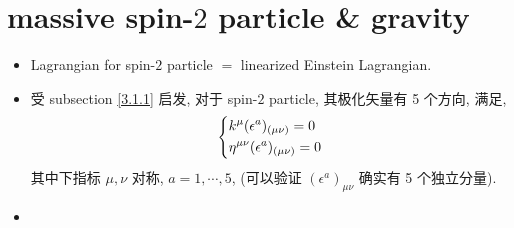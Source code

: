 \section{massive spin-\texorpdfstring{$2$}{2} particle \& gravity}
\begin{itemize}
	\item Lagrangian for spin-$2$ particle $=$ linearized Einstein Lagrangian.
	
	\item 受 subsection \ref{3.1.1} 启发, 对于 spin-$2$ particle, 其极化矢量有 5 个方向, 满足,
	\begin{equation}
		\begin{dcases}
			k^\mu (\epsilon^a)_{(\mu \nu)} = 0 \\
			\eta^{\mu \nu} (\epsilon^a)_{(\mu \nu)} = 0
		\end{dcases}
	\end{equation}
	其中下指标 $\mu, \nu$ 对称, $a = 1, \cdots, 5$, (可以验证 $(\epsilon^a)_{\mu \nu}$ 确实有 5 个独立分量).
	
	\item
\end{itemize}
